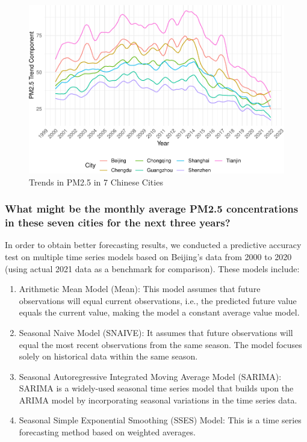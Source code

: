 \documentclass[
  12pt,
]{article}
\providecommand{\tightlist}{%
  \setlength{\itemsep}{0pt}\setlength{\parskip}{0pt}}
\begin{document}
\begin{figure}
\centering
\includegraphics{LiFangRenZhang_ENV872_Project_files/figure-latex/trend figure-1.pdf}
\caption{Trends in PM2.5 in 7 Chinese Cities}
\end{figure}

\hypertarget{what-might-be-the-monthly-average-pm2.5-concentrations-in-these-seven-cities-for-the-next-three-years}{%
\subsubsection{What might be the monthly average PM2.5 concentrations in
these seven cities for the next three
years?}\label{what-might-be-the-monthly-average-pm2.5-concentrations-in-these-seven-cities-for-the-next-three-years}}

In order to obtain better forecasting results, we conducted a predictive
accuracy test on multiple time series models based on Beijing's data
from 2000 to 2020 (using actual 2021 data as a benchmark for
comparison). These models include:

\begin{enumerate}
\def\labelenumi{\arabic{enumi}.}
\tightlist
\item
  Arithmetic Mean Model (Mean): This model assumes that future
  observations will equal current observations, i.e., the predicted
  future value equals the current value, making the model a constant
  average value model.
\item
  Seasonal Naive Model (SNAIVE): It assumes that future observations
  will equal the most recent observations from the same season. The
  model focuses solely on historical data within the same season.
\item
  Seasonal Autoregressive Integrated Moving Average Model (SARIMA):
  SARIMA is a widely-used seasonal time series model that builds upon
  the ARIMA model by incorporating seasonal variations in the time
  series data.
\item
  Seasonal Simple Exponential Smoothing (SSES) Model: This is a time
  series forecasting method based on weighted averages.
\end{enumerate}
\end{document}
